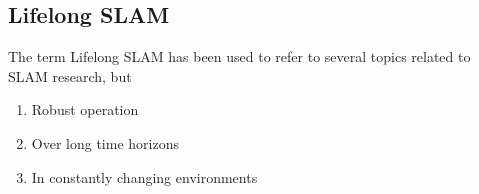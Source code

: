 \subsection{Lifelong SLAM}

The term Lifelong SLAM has been used to refer to several topics related to SLAM research, but 
\begin{singlespace}
    \begin{enumerate}
        \item Robust operation
        \item Over long time horizons
        \item In constantly changing environments
    \end{enumerate}
\end{singlespace}